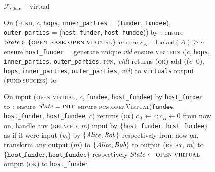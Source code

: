 \begin{figure}[H]
  \begin{systembox}{$\mathcal{F}_{\mathrm{Chan}}$ -- virtual}
    \begin{algorithmic}[1]
      \State On (\textsc{fund}, $c$, \texttt{hops}, \texttt{inner\_parties} =
      (\texttt{funder}, \texttt{fundee}), \texttt{outer\_parties} =
      (\texttt{host\_funder}, \texttt{host\_fundee})) by \alice:
      \label{code:functionality:chan:skeleton:virtual:fund}
      \Indent
        \State ensure $\mathit{State} \in \{\textsc{open base}, \textsc{open
        virtual}\}$
        \label{code:functionality:chan:skeleton:virtual:fund:start}
        \State ensure $c_A - \mathrm{locked}(A) \geq c$
        \State ensure \texttt{host\_funder} = \alice
        \label{code:functionality:chan:skeleton:virtual:fund:id}
        \State generate unique \textit{vid}
        \label{code:functionality:chan:skeleton:virtual:id}
        \State ensure \textsc{virt.fund}($c$, \texttt{hops},
        \texttt{inner\_parties}, \texttt{outer\_parties}, \textsc{pcn},
        \textit{vid}) returns (\textsc{ok})
        \label{code:functionality:chan:skeleton:virtual:fund:virt}
        \State add (($c$, 0), \texttt{hops}, \texttt{inner\_parties},
        \texttt{outer\_parties}, \textit{vid}) to \texttt{virtuals}
        \label{code:functionality:chan:skeleton:virtual:fund:store}
        \State output (\textsc{fund success}) to \alice
        \label{code:functionality:chan:skeleton:virtual:fund:end}
      \EndIndent
      \Statex

      \State On input (\textsc{open virtual}, $c$, \texttt{fundee},
      \texttt{host\_fundee}) by \texttt{host\_funder} to \alice:
      \label{code:functionality:chan:skeleton:virtual:open-virtual}
      \Indent
        \State ensure $\mathit{State} = \textsc{init}$
        \State ensure \textsc{pcn.openVirtual}(\texttt{fundee},
        \texttt{host\_funder}, \texttt{host\_fundee}, $c$) returns (\textsc{ok})
        \label{code:functionality:chan:skeleton:virtual:ln}
        \State $c_A \gets c; c_B \gets 0$
        \State from now on, handle any (\textsc{relayed}, $m$) input by
        \{\texttt{host\_funder}, \texttt{host\_fundee}\} as if it were input
        ($m$) by $\{\mathit{Alice}, \mathit{Bob}\}$ respectively
        \State from now on, transform any output ($m$) to $\{\mathit{Alice}, \mathit{Bob}\}$ to
        output (\textsc{relay}, $m$) to $\{\texttt{host\_funder},
        \texttt{host\_fundee}\}$ respectively
        \State $\mathit{State} \gets \textsc{open virtual}$
        \State output (\textsc{ok}) to \texttt{host\_funder}
      \EndIndent
      \Statex


\end{algorithmic}
\end{systembox}
\end{figure}
